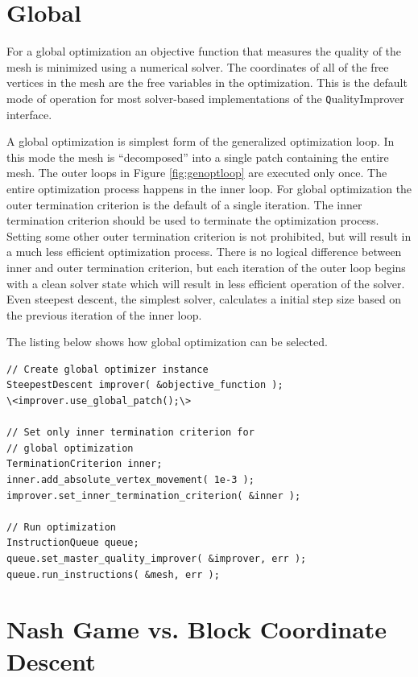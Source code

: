 \section{Global \label{sec:global}}

For a global optimization an objective function that measures the quality of the mesh is minimized using a numerical solver.  The coordinates of all of the free vertices in the mesh are the free variables in the optimization.  This is the default mode of operation for most solver-based implementations of the {\texttt QualityImprover} interface.

A global optimization is simplest form of the generalized optimization loop.  In this mode the mesh is ``decomposed'' into a single patch containing the entire mesh.  The outer loops in Figure \ref{fig:genoptloop} are executed only once.  The entire optimization process happens in the inner loop.  For global optimization the outer termination criterion is the default of a single iteration.  The inner termination criterion should be used to terminate the optimization process.  Setting some other outer termination criterion is not prohibited, but will result in a much less efficient optimization process.  There is no logical difference between inner and outer termination criterion, but each iteration of the outer loop begins with a clean solver state which will result in less efficient operation of the solver.  Even steepest descent, the simplest solver, calculates a initial step size based on the previous iteration of the inner loop.

The listing below shows how global optimization can be selected.

\begin{lstlisting}[frame=single]
// Create global optimizer instance
SteepestDescent improver( &objective_function );
\<improver.use_global_patch();\>

// Set only inner termination criterion for
// global optimization
TerminationCriterion inner;
inner.add_absolute_vertex_movement( 1e-3 );
improver.set_inner_termination_criterion( &inner );

// Run optimization
InstructionQueue queue;
queue.set_master_quality_improver( &improver, err );
queue.run_instructions( &mesh, err );
\end{lstlisting}


\section{Nash Game vs. Block Coordinate Descent}

